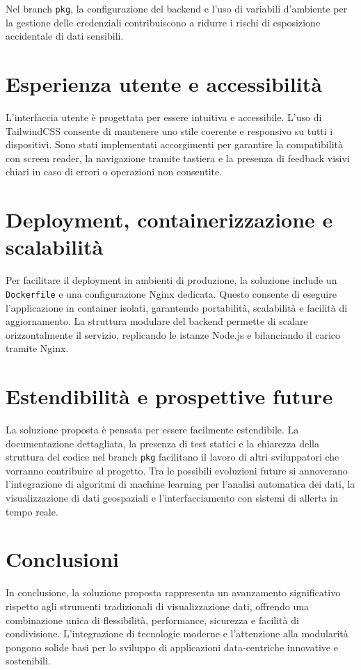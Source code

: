 Nel branch \texttt{pkg}, la configurazione del backend e l’uso di variabili d’ambiente per la gestione delle credenziali contribuiscono a ridurre i rischi di esposizione accidentale di dati sensibili.

\section{Esperienza utente e accessibilità}

L’interfaccia utente è progettata per essere intuitiva e accessibile. L’uso di TailwindCSS consente di mantenere uno stile coerente e responsivo su tutti i dispositivi. Sono stati implementati accorgimenti per garantire la compatibilità con screen reader, la navigazione tramite tastiera e la presenza di feedback visivi chiari in caso di errori o operazioni non consentite.

\section{Deployment, containerizzazione e scalabilità}

Per facilitare il deployment in ambienti di produzione, la soluzione include un \texttt{Dockerfile} e una configurazione Nginx dedicata. Questo consente di eseguire l’applicazione in container isolati, garantendo portabilità, scalabilità e facilità di aggiornamento. La struttura modulare del backend permette di scalare orizzontalmente il servizio, replicando le istanze Node.js e bilanciando il carico tramite Nginx.

\section{Estendibilità e prospettive future}

La soluzione proposta è pensata per essere facilmente estendibile. La documentazione dettagliata, la presenza di test statici e la chiarezza della struttura del codice nel branch \texttt{pkg} facilitano il lavoro di altri sviluppatori che vorranno contribuire al progetto. Tra le possibili evoluzioni future si annoverano l’integrazione di algoritmi di machine learning per l’analisi automatica dei dati, la visualizzazione di dati geospaziali e l’interfacciamento con sistemi di allerta in tempo reale.

\section{Conclusioni}

In conclusione, la soluzione proposta rappresenta un avanzamento significativo rispetto agli strumenti tradizionali di visualizzazione dati, offrendo una combinazione unica di flessibilità, performance, sicurezza e facilità di condivisione. L’integrazione di tecnologie moderne e l’attenzione alla modularità pongono solide basi per lo sviluppo di applicazioni data-centriche innovative e sostenibili.